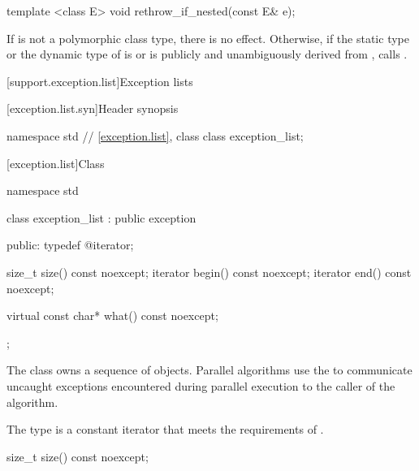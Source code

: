 \begin{itemdecl}
template <class E> void rethrow_if_nested(const E& e);
\end{itemdecl}

\begin{itemdescr}
\pnum
\effects
If  is not a polymorphic class type, there is no effect.
Otherwise, if the static type or the dynamic type of 
is  or is publicly and unambiguously derived from
, calls
 .
\end{itemdescr}

[support.exception.list]{Exception lists}

[exception.list.syn]{Header  synopsis}

%
\begin{codeblock}
namespace std {
  // \ref{exception.list}, class 
  class exception_list;
}
\end{codeblock}

[exception.list]{Class }

\begin{codeblock}
namespace std {
  class exception_list : public exception {
  public:
    typedef @\unspec@ iterator;

    size_t size() const noexcept;
    iterator begin() const noexcept;
    iterator end() const noexcept;

    virtual const char* what() const noexcept;
  };
}
\end{codeblock}

\pnum
The class  owns a sequence of 
objects. Parallel algorithms use the  to communicate
uncaught exceptions encountered during parallel execution to the caller of the
algorithm.

\pnum
The type  is a constant iterator that meets the
requirements of .

\begin{itemdecl}
size_t size() const noexcept;
\end{itemdecl}

